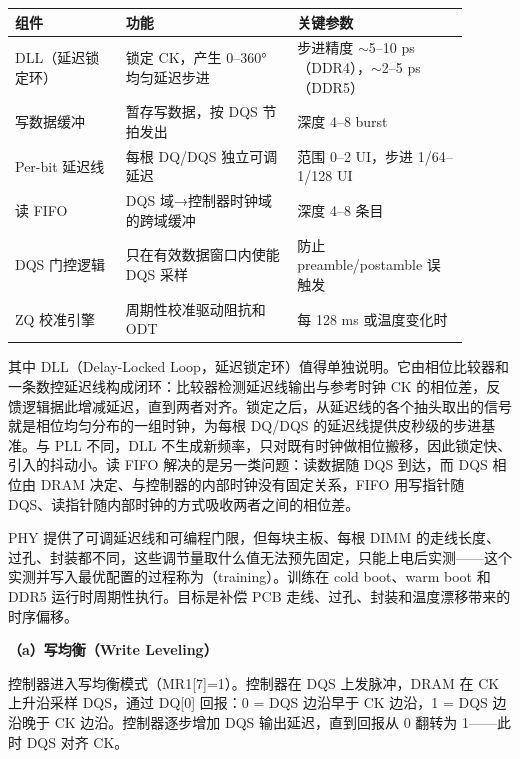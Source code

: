 \begin{longtable}{L{0.22\linewidth}L{0.34\linewidth}L{0.34\linewidth}}
\toprule
组件 & 功能 & 关键参数 \\
\midrule
DLL（延迟锁定环） & 锁定 CK，产生 0--360° 均匀延迟步进 & 步进精度 $\sim$5--10 ps（DDR4），$\sim$2--5 ps（DDR5） \\\tablerowrule
写数据缓冲 & 暂存写数据，按 DQS 节拍发出 & 深度 4--8 burst \\\tablerowrule
Per-bit 延迟线 & 每根 DQ/DQS 独立可调延迟 & 范围 0--2 UI，步进 1/64--1/128 UI \\\tablerowrule
读 FIFO & DQS 域→控制器时钟域的跨域缓冲 & 深度 4--8 条目 \\\tablerowrule
DQS 门控逻辑 & 只在有效数据窗口内使能 DQS 采样 & 防止 preamble/postamble 误触发 \\\tablerowrule
ZQ 校准引擎 & 周期性校准驱动阻抗和 ODT & 每 128 ms 或温度变化时 \\
\bottomrule
\end{longtable}

其中 DLL（Delay-Locked Loop，延迟锁定环）值得单独说明。它由相位比较器和一条数控延迟线构成闭环：比较器检测延迟线输出与参考时钟 CK 的相位差，反馈逻辑据此增减延迟，直到两者对齐。锁定之后，从延迟线的各个抽头取出的信号就是相位均匀分布的一组时钟，为每根 DQ/DQS 的延迟线提供皮秒级的步进基准。与 PLL 不同，DLL 不生成新频率，只对既有时钟做相位搬移，因此锁定快、引入的抖动小。读 FIFO 解决的是另一类问题：读数据随 DQS 到达，而 DQS 相位由 DRAM 决定、与控制器的内部时钟没有固定关系，FIFO 用写指针随 DQS、读指针随内部时钟的方式吸收两者之间的相位差。


PHY 提供了可调延迟线和可编程门限，但每块主板、每根 DIMM 的走线长度、过孔、封装都不同，这些调节量取什么值无法预先固定，只能上电后实测——这个实测并写入最优配置的过程称为（training）。训练在 cold boot、warm boot 和 DDR5 运行时周期性执行。目标是补偿 PCB 走线、过孔、封装和温度漂移带来的时序偏移。

\textbf{（a）写均衡（Write Leveling）}

控制器进入写均衡模式（MR1[7]=1）。控制器在 DQS 上发脉冲，DRAM 在 CK 上升沿采样 DQS，通过 DQ[0] 回报：0 = DQS 边沿早于 CK 边沿，1 = DQS 边沿晚于 CK 边沿。控制器逐步增加 DQS 输出延迟，直到回报从 0 翻转为 1——此时 DQS 对齐 CK。


